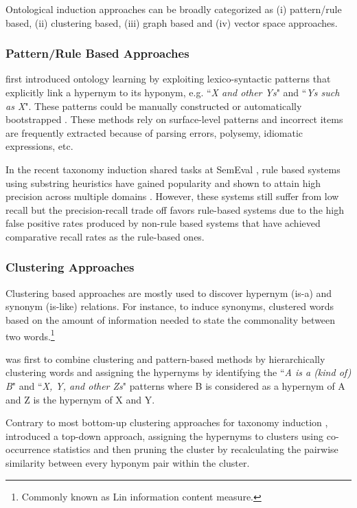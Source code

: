 Ontological induction approaches can be broadly categorized as (i) pattern/rule based, (ii) clustering based, (iii) graph based and (iv) vector space approaches. 

\subsubsection{Pattern/Rule Based Approaches}

\citet{hearst1992} first introduced ontology learning by exploiting lexico-syntactic patterns that explicitly link a hypernym to its hyponym, e.g.  ``\emph{X and other Ys}" and ``\emph{Ys such as X}". These patterns could be manually constructed \citep{berland1999finding,kozareva2008} or automatically bootstrapped \citep{girju2003automatic}. These methods rely on surface-level patterns and incorrect items are frequently extracted because of parsing errors, polysemy, idiomatic expressions, etc.

In the recent taxonomy induction shared tasks at SemEval \citep{task13semeval2016,bordea-EtAl:2015:SemEval}, rule based systems using substring heuristics have gained popularity and shown to attain high precision across multiple domains \citep[e.g.][]{lefever:2015:SemEval,panchenko2016taxi,usaarsemeval2016}. However, these systems still suffer from low recall but the precision-recall trade off favors rule-based systems due to the high false positive rates produced by non-rule based systems \citep[e.g.][]{nuigsemeval2016} that have achieved comparative recall rates as the rule-based ones.

\subsubsection{Clustering Approaches}

Clustering based approaches are mostly used to discover hypernym (is-a) and synonym (is-like) relations. For instance, to induce synonyms, \citet{lin1998automatic} clustered words based on the amount of information needed to state the commonality between two words.\footnote{Commonly known as Lin information content measure.}

\cite{Caraballo1999} was first to combine clustering and pattern-based methods by hierarchically clustering words and assigning the hypernyms by identifying the ``\emph{A is a (kind of) B}" and ``\emph{X, Y, and other Zs}" patterns where B is considered as a hypernym of A and Z is the hypernym of X and Y. 

Contrary to most bottom-up clustering approaches for taxonomy induction \citep{Caraballo2001,lin1998automatic}, \citet{pantelravi2004} introduced a top-down approach, assigning the hypernyms to clusters using co-occurrence statistics and then pruning the cluster by recalculating the pairwise similarity between every hyponym pair within the cluster.

